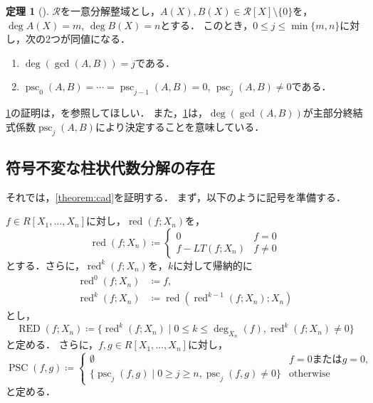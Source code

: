 \documentclass[uplatex, dvipdfmx]{jsarticle}
\numberwithin{equation}{section}
\DeclareMathOperator{\psc}{psc}
\DeclareMathOperator{\PSC}{PSC}
\DeclareMathOperator{\RED}{RED}
\DeclareMathOperator{\red}{red}
\theoremstyle{definition}
\newtheorem{theorem}[definition]{定理}
\begin{document}
\begin{theorem}[{\cite[Theorem 2]{MR0403962}}] \label{theorem:psc}
     $\mathcal{R}$を一意分解整域とし，$A(X), B(X) \in \mathcal{R}[X] \setminus \{0\}$を，$\deg A(X) = m$, $\deg B(X) = n$とする．
     このとき，$0 \leq j \leq \min\{m,n\}$に対し，次の2つが同値になる．
     \begin{enumerate}
          \item $\deg(\gcd(A,B)) = j$である．
          \item $\psc_0(A,B) = \cdots = \psc_{j-1}(A,B) = 0$, $\psc_j(A,B) \neq 0$である．
     \end{enumerate}
\end{theorem}

\cref{theorem:psc}の証明は，\cite[Theorem 2]{MR0403962}を参照してほしい．
また，\cref{theorem:psc}は，$\deg(\gcd(A,B))$が主部分終結式係数$\psc_j(A, B)$により決定することを意味している．

\subsection{符号不変な柱状代数分解の存在}
それでは，\cref{theorem:cad}を証明する．
まず，以下のように記号を準備する．

$f \in R[X_1, \dots, X_n]$に対し，$\red(f;X_n)$を，
\begin{equation}
     \red(f;X_n) \coloneqq \begin{cases}
          0 &  f = 0 \\
          f - LT(f;X_n) & f \neq 0
     \end{cases}
\end{equation}
とする．さらに，$\red^k(f;X_n)$を，$k$に対して帰納的に
\begin{align}
     \red^0(f;X_n) &\coloneqq f,\\
     \red^k(f;X_n) &\coloneqq \red(\red^{k-1}(f;X_n);X_n)
\end{align}
とし，
\begin{equation}
     \RED(f;X_n) \coloneqq \{\red^k(f;X_n) \mid 0 \leq k \leq \deg_{X_n}(f), \red^k(f;X_n) \neq 0\}
\end{equation}
と定める．
さらに，$f, g \in R[X_1, \dots, X_n]$に対し，
\begin{equation}
     \PSC(f, g) \coloneqq \begin{cases}
          \emptyset & \text{$f = 0$または$g = 0$,}\\
          \{\psc_j(f, g) \mid 0 \geq j \geq n, \psc_j(f, g) \neq 0\} & \text{otherwise}
     \end{cases}
\end{equation}
と定める．
\end{document}
